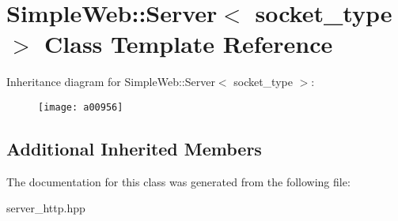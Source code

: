 \hypertarget{a00956}{}\section{Simple\+Web\+:\+:Server$<$ socket\+\_\+type $>$ Class Template Reference}
\label{a00956}
Inheritance diagram for Simple\+Web\+:\+:Server$<$ socket\+\_\+type $>$\+:\begin{figure}[H]
\begin{center}
\leavevmode
\texttt{[image: a00956]}
\end{center}
\end{figure}
\subsection*{Additional Inherited Members}


The documentation for this class was generated from the following file\+:\begin{DoxyCompactItemize}
\item 
server\+\_\+http.\+hpp\end{DoxyCompactItemize}
